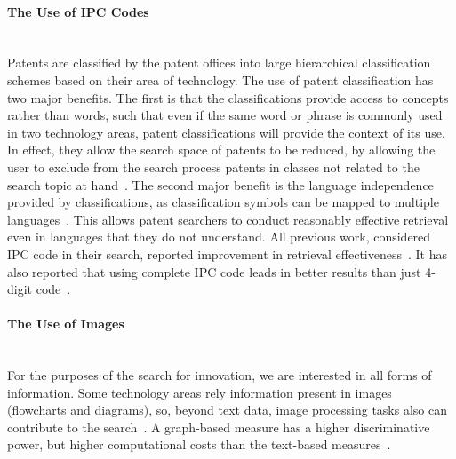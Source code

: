 \paragraph{The Use of IPC Codes}
\ \\
Patents are classified by the patent offices into large hierarchical classification schemes based on their area of technology. The use of patent
classification has two major benefits. The first is that the classifications provide access to concepts rather than words, such that even
if the same word or phrase is commonly used in two technology areas, patent classifications will provide the context of its use. In effect, they
allow the search space of patents to be reduced, by allowing the user to exclude from the search process patents in classes not related to
the search topic at hand~\citep{lopez2010patatras}. The second major benefit is the language independence provided by classifications, as classification symbols can be mapped to multiple languages~\citep{DBLP:conf/clef/DhondtV10}. This allows patent searchers to conduct reasonably effective retrieval even in languages that they do not understand. All previous work, considered IPC code in their search, reported improvement in retrieval effectiveness~\citep{fujita2005revisiting, kang2007cluster, herbert2010prior, graf2010knowledge, harris2009role, harris2010comparison, harris2011using, verma2011applying}. It has also reported that using complete IPC code leads in better results than just 4-digit code~\citep{ gobeill2010simple}.
\paragraph{The Use of Images}
\ \\
For the purposes of the search for innovation, we are interested in all forms of information. Some technology areas rely information present in images (flowcharts and diagrams), so, beyond text data, image processing tasks also can contribute to the search~\citep{lupu2013patent}. A graph-based measure has a higher discriminative power, but higher computational costs than the text-based measures~\citep{lupu2013evaluating}.
